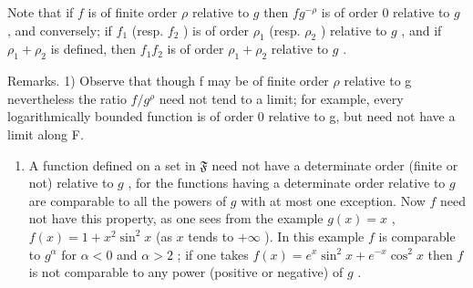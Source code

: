 Note that if \(f\) is of finite order \(\rho\) relative to \(g\) then \(fg^{-\rho}\) is of order 0 relative to \(g\) , and conversely; if \(f_1\) (resp. \(f_2\) ) is of order \(\rho_1\) (resp. \(\rho_2\) ) relative to \(g\) , and if \(\rho_1 + \rho_2\) is defined, then \(f_1f_2\) is of order \(\rho_1 + \rho_2\) relative to \(g\) .

Remarks. 1) Observe that though f may be of finite order \(\rho\) relative to g nevertheless the ratio \(f/g^{\rho}\) need not tend to a limit; for example, every logarithmically bounded function is of order 0 relative to g, but need not have a limit along F.

\begin{enumerate}
\def\labelenumi{\arabic{enumi})}
\setcounter{enumi}{1}
\tightlist
\item
  A function defined on a set in \(\mathfrak{F}\) need not have a determinate order (finite or not) relative to \(g\) , for the functions having a determinate order relative to \(g\) are comparable to all the powers of \(g\) with at most one exception. Now \(f\) need not have this property, as one sees from the example \(g(x) = x\) , \(f(x) = 1 + x^2 \sin^2 x\) (as \(x\) tends to \(+\infty\) ). In this example \(f\) is comparable to \(g^\alpha\) for \(\alpha < 0\) and \(\alpha > 2\) ; if one takes \(f(x) = e^x \sin^2 x + e^{-x} \cos^2 x\) then \(f\) is not comparable to any power (positive or negative) of \(g\) .
\end{enumerate}

